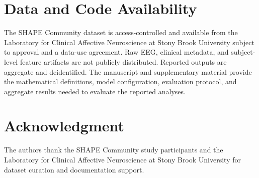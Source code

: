 \documentclass[journal]{IEEEtran}
\begin{document}
\section*{Data and Code Availability}
The SHAPE Community dataset is access-controlled and available from the Laboratory for Clinical Affective Neuroscience at Stony Brook University subject to approval and a data-use agreement. Raw EEG, clinical metadata, and subject-level feature artifacts are not publicly distributed. Reported outputs are aggregate and deidentified. The manuscript and supplementary material provide the mathematical definitions, model configuration, evaluation protocol, and aggregate results needed to evaluate the reported analyses.

\section*{Acknowledgment}
The authors thank the SHAPE Community study participants and the Laboratory for Clinical Affective Neuroscience at Stony Brook University for dataset curation and documentation support.
\end{document}
